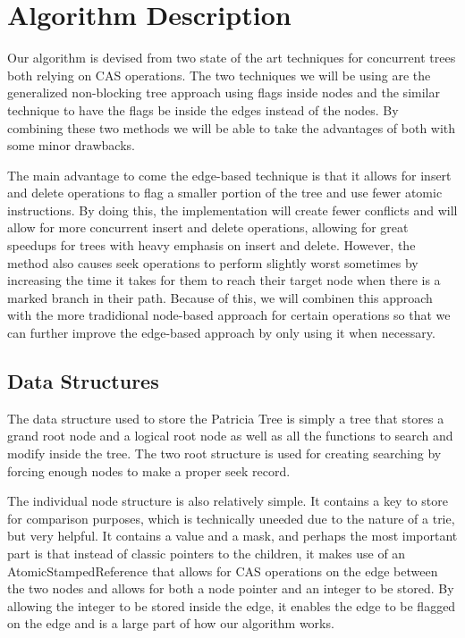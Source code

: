 \documentclass[conference]{IEEEtran}
\begin{document}
\section{Algorithm Description}
Our algorithm is devised from two state of the art techniques for concurrent trees both relying on CAS operations. The two techniques we will be using are the generalized non-blocking tree approach using flags inside nodes \cite{Shafiei2013,Brown2014} and the similar technique to have the flags be inside the edges instead of the nodes. \cite{Natarajan2014} By combining these two methods we will be able to take the advantages of both with some minor drawbacks.
\par
The main advantage to come the edge-based technique is that it allows for insert and delete operations to flag a smaller portion of the tree and use fewer atomic instructions. \cite{Natarajan2014} By doing this, the implementation will create fewer conflicts and will allow for more concurrent insert and delete operations, allowing for great speedups for trees with heavy emphasis on insert and delete. However, the method also causes seek operations to perform slightly worst sometimes by increasing the time it takes for them to reach their target node when there is a marked branch in their path. Because of this, we will combinen this approach with the more tradidional node-based approach for certain operations so that we can further improve the edge-based approach by only using it when necessary. 

\subsection{Data Structures}
The data structure used to store the Patricia Tree is simply a tree that stores a grand root node and a logical root node as well as all the functions to search and modify inside the tree. The two root structure is used for creating searching by forcing enough nodes to make a proper seek record.
\par
The individual node structure is also relatively simple. It contains a key to store for comparison purposes, which is technically uneeded due to the nature of a trie, but very helpful. It contains a value and a mask, and perhaps the most important part is that instead of classic pointers to the children, it makes use of an AtomicStampedReference that allows for CAS operations on the edge between the two nodes and allows for both a node pointer and an integer to be stored. By allowing the integer to be stored inside the edge, it enables the edge to be flagged on the edge and is a large part of how our algorithm works.
\end{document}
